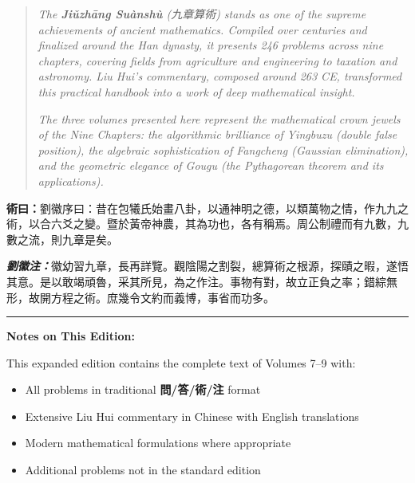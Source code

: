 \documentclass[11pt,a4paper]{article}
\newcommand{\shu}[1]{\textbf{術曰：}#1\par}
\newcommand{\liuhui}[1]{{\color{commentarycolor}\textit{\textbf{劉徽注：}}#1\par}}
\begin{document}
\begin{quote}
\color{quotecolor}
\textit{The \textbf{Jiǔzhāng Suànshù} (九章算術) stands as one of the supreme achievements of ancient mathematics. Compiled over centuries and finalized around the Han dynasty, it presents 246 problems across nine chapters, covering fields from agriculture and engineering to taxation and astronomy. Liu Hui's commentary, composed around 263 CE, transformed this practical handbook into a work of deep mathematical insight.}

\textit{The three volumes presented here represent the mathematical crown jewels of the Nine Chapters: the algorithmic brilliance of Yingbuzu (double false position), the algebraic sophistication of Fangcheng (Gaussian elimination), and the geometric elegance of Gougu (the Pythagorean theorem and its applications).}
\end{quote}

\vspace{0.5cm}

\shu{劉徽序曰：昔在包犧氏始畫八卦，以通神明之德，以類萬物之情，作九九之術，以合六爻之變。暨於黃帝神農，其為功也，各有稱焉。周公制禮而有九數，九數之流，則九章是矣。}

\liuhui{徽幼習九章，長再詳覽。觀陰陽之割裂，總算術之根源，探賾之暇，遂悟其意。是以敢竭頑魯，采其所見，為之作注。事物有對，故立正負之率；錯綜無形，故開方程之術。庶幾令文約而義博，事省而功多。}

\vspace{0.5cm}

\begin{center}
\rule{0.4\textwidth}{0.4pt}
\end{center}

\vspace{0.5cm}

\noindent\textbf{Notes on This Edition:}

This expanded edition contains the complete text of Volumes 7--9 with:
\begin{itemize}[noitemsep]
  \item All problems in traditional \textbf{問/答/術/注} format
  \item Extensive Liu Hui commentary in Chinese with English translations
  \item Modern mathematical formulations where appropriate
  \item Additional problems not in the standard edition
\end{itemize}

\newpage
\end{document}
